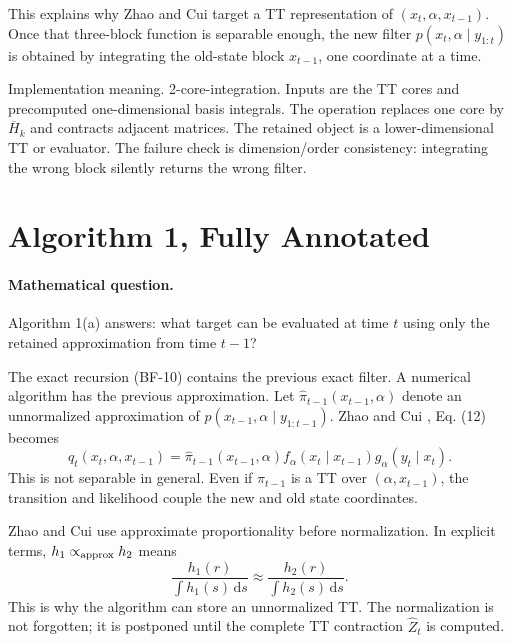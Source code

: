 \documentclass[11pt]{article}
\numberwithin{equation}{section}
\newcommand{\dd}{\,\mathrm d}
\begin{document}
This explains why Zhao and Cui \cite{zhao2024ttsequential} target a TT representation of
\((x_t,\alpha,x_{t-1})\).  Once that three-block function is separable enough,
the new filter \(p(x_t,\alpha\mid y_{1:t})\) is obtained by integrating the
old-state block \(x_{t-1}\), one coordinate at a time.

Implementation meaning. 2-core-integration.  Inputs are the TT cores and
precomputed one-dimensional basis integrals.  The operation replaces one core
by \(\overline H_k\) and contracts adjacent matrices.  The retained object is a
lower-dimensional TT or evaluator.  The failure check is dimension/order
consistency: integrating the wrong block silently returns the wrong filter.

\section{Algorithm 1, Fully Annotated}

\paragraph{Mathematical question.}
Algorithm 1(a) answers: what target can be evaluated at time \(t\) using only
the retained approximation from time \(t-1\)?

The exact recursion (BF-10) contains the previous exact filter.  A numerical
algorithm has the previous approximation.  Let
\(\widehat\pi_{t-1}(x_{t-1},\alpha)\) denote an unnormalized approximation of
\(p(x_{t-1},\alpha\mid y_{1:t-1})\).  Zhao and Cui \cite{zhao2024ttsequential}, Eq. (12) becomes
\begin{equation}
    q_t(x_t,\alpha,x_{t-1})
    =
    \widehat\pi_{t-1}(x_{t-1},\alpha)
    f_\alpha(x_t\mid x_{t-1})
    g_\alpha(y_t\mid x_t).
    \label{eq:p24-a1-1}
\end{equation}
This is not separable in general.  Even if
\(\widehat\pi_{t-1}\) is a TT over \((\alpha,x_{t-1})\), the transition and
likelihood couple the new and old state coordinates.

Zhao and Cui \cite{zhao2024ttsequential} use approximate proportionality before normalization.  In explicit
terms, \(h_1\propto_{\rm approx} h_2\) means
\begin{equation}
    \frac{h_1(r)}{\int h_1(s)\dd s}
    \approx
    \frac{h_2(r)}{\int h_2(s)\dd s}.
    \label{eq:p24-a1-0}
\end{equation}
This is why the algorithm can store an unnormalized TT.  The normalization is
not forgotten; it is postponed until the complete TT contraction
\(\widehat Z_t\) is computed.
\end{document}
